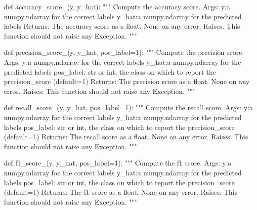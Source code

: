\documentclass[]{article}
\newenvironment{Shaded}{\begin{snugshade}}{\end{snugshade}}
\newcommand{\CommentTok}[1]{\textcolor[rgb]{0.48,0.49,0.49}{#1}}
\newcommand{\DecValTok}[1]{\textcolor[rgb]{0.96,0.45,0.00}{#1}}
\newcommand{\KeywordTok}[1]{\textcolor[rgb]{0.81,0.81,0.76}{#1}}
\newcommand{\NormalTok}[1]{\textcolor[rgb]{0.81,0.81,0.76}{#1}}
\newcommand{\OperatorTok}[1]{\textcolor[rgb]{0.81,0.81,0.76}{#1}}
\begin{document}
\begin{Shaded}
\begin{Highlighting}[]
\KeywordTok{def}\NormalTok{ accuracy_score_(y, y_hat):}
    \CommentTok{"""}
\CommentTok{    Compute the accuracy score.}
\CommentTok{    Args:}
\CommentTok{        y:a numpy.ndarray for the correct labels}
\CommentTok{        y_hat:a numpy.ndarray for the predicted labels}
\CommentTok{    Returns: }
\CommentTok{        The accuracy score as a float.}
\CommentTok{        None on any error.}
\CommentTok{    Raises:}
\CommentTok{        This function should not raise any Exception.}
\CommentTok{    """}

\KeywordTok{def}\NormalTok{ precision_score_(y, y_hat, pos_label}\OperatorTok{=}\DecValTok{1}\NormalTok{):}
    \CommentTok{"""}
\CommentTok{    Compute the precision score.}
\CommentTok{    Args:}
\CommentTok{        y:a numpy.ndarray for the correct labels}
\CommentTok{        y_hat:a numpy.ndarray for the predicted labels}
\CommentTok{        pos_label: str or int, the class on which to report the precision_score (default=1)}
\CommentTok{    Returns: }
\CommentTok{        The precision score as a float.}
\CommentTok{        None on any error.}
\CommentTok{    Raises:}
\CommentTok{        This function should not raise any Exception.}
\CommentTok{    """}

\KeywordTok{def}\NormalTok{ recall_score_(y, y_hat, pos_label}\OperatorTok{=}\DecValTok{1}\NormalTok{):}
    \CommentTok{"""}
\CommentTok{    Compute the recall score.}
\CommentTok{    Args:}
\CommentTok{        y:a numpy.ndarray for the correct labels}
\CommentTok{        y_hat:a numpy.ndarray for the predicted labels}
\CommentTok{        pos_label: str or int, the class on which to report the precision_score (default=1)}
\CommentTok{    Returns: }
\CommentTok{        The recall score as a float.}
\CommentTok{        None on any error.}
\CommentTok{    Raises:}
\CommentTok{        This function should not raise any Exception.}
\CommentTok{    """}

\KeywordTok{def}\NormalTok{ f1_score_(y, y_hat, pos_label}\OperatorTok{=}\DecValTok{1}\NormalTok{):}
    \CommentTok{"""}
\CommentTok{    Compute the f1 score.}
\CommentTok{    Args:}
\CommentTok{        y:a numpy.ndarray for the correct labels}
\CommentTok{        y_hat:a numpy.ndarray for the predicted labels}
\CommentTok{        pos_label: str or int, the class on which to report the precision_score (default=1)}
\CommentTok{    Returns: }
\CommentTok{        The f1 score as a float.}
\CommentTok{        None on any error.}
\CommentTok{    Raises:}
\CommentTok{        This function should not raise any Exception.}
\CommentTok{    """}
\end{Highlighting}
\end{Shaded}
\end{document}
